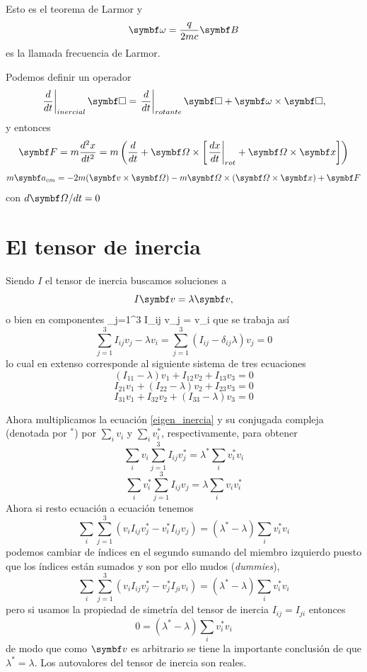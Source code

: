 \documentclass[10pt,oneside]{CBFT_book}
\begin{document}
Esto es el teorema de Larmor y 
\[
	\vb{\omega} = \frac{q}{2 m c} \vb{B}
\]
es la llamada frecuencia de Larmor.

Podemos definir un operador 
\[
	\left.\dtot{}{t}\right|_{inercial} \vb{\Box} =  \left.\dtot{}{t}\right|_{rotante} \vb{\Box}
	+ \vb{\omega } \times \vb{ \Box },
\]
y entonces
\[
	\vb{F} = m \dtot[2]{x}{t} = m \left( \dtot{}{t} + \vb{\Omega} \times 
	\left[ \left.\dtot{x}{t}\right|_{rot} + \vb{\Omega} \times \vb{x} \right] \right)
\]
\[
	m \vb{a}_{cm} = - 2 m ( \vb{v}\times\vb{\Omega}) - m \vb{\Omega} \times (\vb{\Omega}\times\vb{x}) + \vb{F}
\]
con $d\vb{\Omega}/dt = 0$

\section{El tensor de inercia}

Siendo $I$ el tensor de inercia buscamos soluciones a
\[
	I \vb{v} = \lambda \vb{v},
\]
o bien en componentes
\be
	 \sum_{j=1}^3 I_{ij} v_j = \lambda v_i
\label{eigen_inercia}	 
\ee
que se trabaja así
\[
	 \sum_{j=1}^3 I_{ij} v_j - \lambda v_i =  \sum_{j=1}^3 ( I_{ij} - \delta_{ij}\lambda ) v_j = 0
\]
lo cual en extenso corresponde al siguiente sistema de tres ecuaciones
\[
	(I_{11} - \lambda)v_1 + I_{12} v_2 + I_{13} v_3 = 0
\]
\[
	I_{21} v_1 + (I_{22} - \lambda) v_2 + I_{23} v_3 = 0
\]
\[
	I_{31} v_1 + I_{32} v_2 + (I_{33} - \lambda) v_3 = 0
\]

Ahora multiplicamos la ecuación \eqref{eigen_inercia} y su conjugada compleja (denotada por $^*$) por $\sum_i v_i$
y $\sum_i v_i^*$, respectivamente, para obtener
\[
	\sum_i v_i \sum_{j=1}^3 I_{ij} v_j^* = \lambda^* \sum_i v_i^*  v_i
\]
\[
	\sum_i v_i^* \sum_{j=1}^3 I_{ij} v_j = \lambda \sum_i v_i v_i^*
\]
Ahora si resto ecuación a ecuación tenemos
\[
	\sum_i \sum_{j=1}^3 ( v_i I_{ij} v_j^* - v_i^* I_{ij} v_j ) =
	(\lambda^* - \lambda )\sum_i v_i^* v_i 
\]
podemos cambiar de índices en el segundo sumando del miembro izquierdo puesto que los índices están sumados y son
por ello mudos ({\it dummies}),
\[
	\sum_i \sum_{j=1}^3 ( v_i I_{ij} v_j^* - v_j^* I_{ji} v_i ) =
	(\lambda^* - \lambda )\sum_i v_i^* v_i 
\]
pero si usamos la propiedad de simetría del tensor de inercia $I_{ij}=I_{ji}$ entonces
\[
	0 = (\lambda^* - \lambda )\sum_i v_i^* v_i 
\]
de modo que como $\vb{v}$ es arbitrario se tiene la importante conclusión de que $\lambda^* = \lambda$.
Los autovalores del tensor de inercia son reales.
\end{document}
